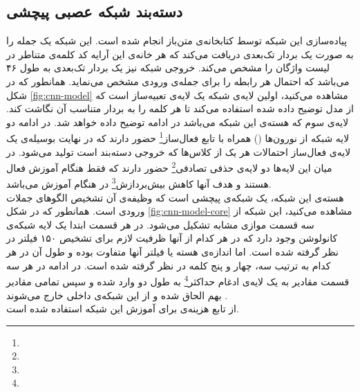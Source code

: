 \subsection{دسته‌بند شبکه عصبی پیچشی}
پیاده‌سازی این شبکه توسط کتابخانه‌ی متن‌باز  انجام شده است. این شبکه یک جمله را به صورت یک بردار تک‌بعدی دریافت می‌کند که هر خانه‌ی این آرایه کد کلمه‌ی متناطر در لیست واژگان را مشخص می‌کند. خروجی شبکه نیز یک بردار تک‌بعدی به طول ۴۶ می‌باشد که احتمال هر رابطه را برای جمله‌ی ورودی مشخص می‌نماید. همانطور که در شکل  \ref{fig:cnn-model} مشاهده می‌کنید، اولین لایه‌ی شبکه یک لایه‌ی تعبیه‌ساز است که از مدل  توضیح داده شده استفاده می‌کند تا هر کلمه را به بردار متناسب آن نگاشت کند.
لایه‌ی سوم که هسته‌ی این شبکه می‌باشد در ادامه توضیح داده خواهد شد. 
در ادامه دو لایه شبکه‌ از نورون‌ها () همراه با تابع فعال‌ساز\footnote{}  حضور دارند که در نهایت بوسیله‌ی یک لایه‌ی فعال‌ساز  احتمالات هر یک از کلاس‌ها که خروجی دسته‌بند است تولید می‌شود. در میان این لایه‌ها دو لایه‌ی حذفی تصادفی\footnote{} حضور دارند که فقط هنگام آموزش فعال هستند و هدف آنها کاهش بیش‌بردازش\footnote{} در هنگام آموزش می‌باشد. \\
هسته‌ی این شبکه، یک شبکه‌ی پیچشی است که وظیفه‌ی آن تشخیص الگوهای جملات ورودی است. همانطور که در شکل \ref{fig:cnn-model-core} مشاهده می‌کنید، این شبکه از سه قسمت موازی مشابه تشکیل می‌شود. در هر قسمت ابتدا یک لایه شبکه‌ی کانولوشن وجود دارد که در هر کدام از آنها ظرفیت لازم برای تشخیص ۱۵۰ فیلتر در نظر گرفته شده است. اما اندازه‌ی هسته یا فیلتر آنها متفاوت بوده و طول آن در هر کدام به ترتیب سه، چهار و پنج کلمه در نظر گرفته شده است. در ادامه در هر سه قسمت مقادیر به یک لایه‌ی ادغام حداکثر\footnote{} به طول دو وارد شده و سپس تمامی مقادیر بهم الحاق شده و از این شبکه‌ی داخلی خارج می‌شوند \cite{yoon2014conv}.
\\از تابع هزینه‌ی  برای آموزش این شبکه استفاده شده است.
